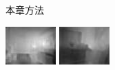 \begin{figure}[htb]
\begin{subfigure}{0.24\linewidth}
\begin{minipage}[b]{1\linewidth}
  \end{minipage}
  \caption{本章方法}
  \end{subfigure}
  \begin{subfigure}{0.24\linewidth}
  \begin{minipage}[b]{1\linewidth}
  \includegraphics[width=1\linewidth]{figure/Pixel_cla_nyu/1eigen.jpg}\vspace{3.5pt}
  \includegraphics[width=1\linewidth]{figure/Pixel_cla_nyu/2eigen.jpg}\vspace{3.5pt}

\end{minipage}
\end{subfigure}
\end{figure}

